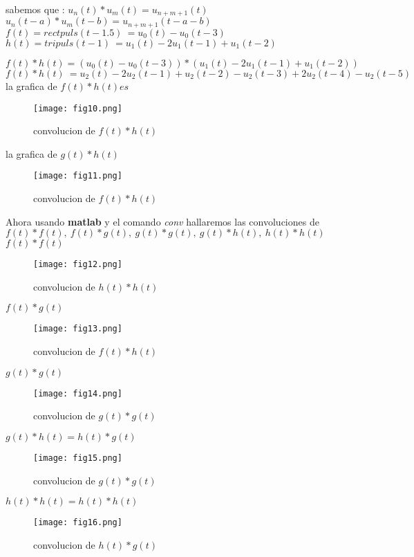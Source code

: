 \documentclass[12pt]{article}
\begin{document}
\newline


sabemos que :\newline \newline
$u_{n}(t)*u_{m}(t)=u_{n+m+1}(t)$\newline
$u_{n}(t-a)*u_{m}(t-b)=u_{n+m+1}(t-a-b)$\newline\newline
$f(t)=rectpuls(t-1.5)\ = u_0(t)-u_0(t-3)$\newline 
$h(t)=tripuls(t-1) \ = u_1(t)-2u_1(t-1)+u_1(t-2)$\newline 

$f(t)*h(t)=(u_0(t)-u_0(t-3))*(u_1(t)-2u_1(t-1)+u_1(t-2))$\newline
$f(t)*h(t) \ =u_2(t)-2u_2(t-1)+u_2(t-2)-u_2(t-3)+2u_2(t-4)-u_2(t-5)$\newline \newline
la grafica de $f(t)*h(t) es $

\begin{figure}[H]
    \centering
    \texttt{[image: fig10.png]}
    \caption{convolucion de $f(t)*h(t)$ }
\end{figure}  \newpage
la grafica de $g(t)*h(t)$\newline \newline
\begin{figure}[H]
    \centering
    \texttt{[image: fig11.png]}
    \caption{convolucion de $f(t)*h(t)$ }
\end{figure}
\newpage










Ahora usando \textbf{matlab} y el comando \textit{conv}  hallaremos las convoluciones de $f(t)*f(t),\ f(t)*g(t), \ g(t)*g(t),\ g(t)*h(t),\ h(t)*h(t)$
\newline \newline
\textbf{$f(t)*f(t)$}
\begin{figure}[H]
    \centering
    \texttt{[image: fig12.png]}
    \caption{convolucion de $h(t)*h(t)$ }
\end{figure}
\newpage
\textbf{$f(t)*g(t)$}
\begin{figure}[H]
    \centering
    \texttt{[image: fig13.png]}
    \caption{convolucion de $f(t)*h(t)$ }
\end{figure}
\newpage
\textbf{$g(t)*g(t)$}
\begin{figure}[H]
    \centering
    \texttt{[image: fig14.png]}
    \caption{convolucion de $g(t)*g(t)$ }
\end{figure} 
\newpage
\textbf{$g(t)*h(t)=h(t)*g(t)$}
\begin{figure}[H]
    \centering
    \texttt{[image: fig15.png]}
    \caption{convolucion de $g(t)*g(t)$ }
\end{figure} 
\newpage
\textbf{$h(t)*h(t)=h(t)*h(t)$}

\begin{figure}[H]
    \centering
    \texttt{[image: fig16.png]}
    \caption{convolucion de $h(t)*g(t)$ }
\end{figure}
\end{document}
